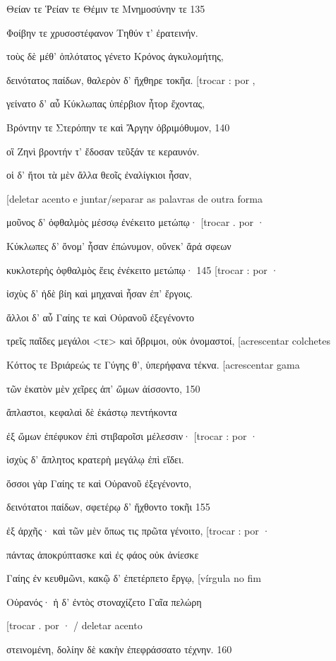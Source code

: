 Θείαν τε Ῥείαν τε Θέμιν τε Μνημοσύνην τε 135

Φοίβην τε χρυσοστέφανον Τηθύν τ' ἐρατεινήν.

τοὺς δὲ μέθ' ὁπλότατος γένετο Κρόνος ἀγκυλομήτης,

δεινότατος παίδων, θαλερὸν δ' ἤχθηρε τοκῆα. {[}trocar : por ,

γείνατο δ' αὖ Κύκλωπας ὑπέρβιον ἦτορ ἔχοντας,

Βρόντην τε Στερόπην τε καὶ Ἄργην ὀβριμόθυμον, 140

οἳ Ζηνὶ βροντήν τ' ἔδοσαν τεῦξάν τε κεραυνόν.

οἱ δ' ἤτοι τὰ μὲν ἄλλα θεοῖς ἐναλίγκιοι ἦσαν,

{[}deletar acento e juntar/separar as palavras de outra forma

μοῦνος δ' ὀφθαλμὸς μέσσῳ ἐνέκειτο μετώπῳ· {[}trocar . por ·

Κύκλωπες δ' ὄνομ' ἦσαν ἐπώνυμον, οὕνεκ' ἄρά σφεων

κυκλοτερὴς ὀφθαλμὸς ἕεις ἐνέκειτο μετώπῳ· 145 {[}trocar : por ·

ἰσχὺς δ' ἠδὲ βίη καὶ μηχαναὶ ἦσαν ἐπ' ἔργοις.

ἄλλοι δ' αὖ Γαίης τε καὶ Οὐρανοῦ ἐξεγένοντο

τρεῖς παῖδες μεγάλοι \textless{}τε\textgreater{} καὶ ὄβριμοι, οὐκ
ὀνομαστοί, {[}acrescentar colchetes

Κόττος τε Βριάρεώς τε Γύγης θ', ὑπερήφανα τέκνα. {[}acrescentar gama

τῶν ἑκατὸν μὲν χεῖρες ἀπ' ὤμων ἀίσσοντο, 150

ἄπλαστοι, κεφαλαὶ δὲ ἑκάστῳ πεντήκοντα

ἐξ ὤμων ἐπέφυκον ἐπὶ στιβαροῖσι μέλεσσιν· {[}trocar : por ·

ἰσχὺς δ' ἄπλητος κρατερὴ μεγάλῳ ἐπὶ εἴδει.

ὅσσοι γὰρ Γαίης τε καὶ Οὐρανοῦ ἐξεγένοντο,

δεινότατοι παίδων, σφετέρῳ δ' ἤχθοντο τοκῆι 155

ἐξ ἀρχῆς· καὶ τῶν μὲν ὅπως τις πρῶτα γένοιτο, {[}trocar : por ·

πάντας ἀποκρύπτασκε καὶ ἐς φάος οὐκ ἀνίεσκε

Γαίης ἐν κευθμῶνι, κακῷ δ' ἐπετέρπετο ἔργῳ, {[}vírgula no fim

Οὐρανός· ἡ δ' ἐντὸς στοναχίζετο Γαῖα πελώρη

{[}trocar . por · / deletar acento

στεινομένη, δολίην δὲ κακὴν ἐπεφράσσατο τέχνην. 160

